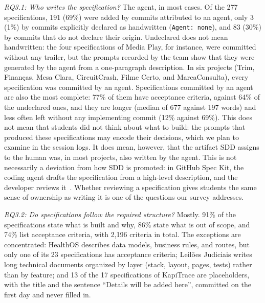 \documentclass[conference]{IEEEtran}
\begin{document}
\emph{RQ3.1: Who writes the specification?} The agent, in most cases. Of the 277 specifications, 191 (69\%) were added by commits attributed to an agent, only 3 (1\%) by commits explicitly declared as handwritten (\texttt{Agent: none}), and 83 (30\%) by commits that do not declare their origin. Undeclared does not mean handwritten: the four specifications of Media Play, for instance, were committed without any trailer, but the prompts recorded by the team show that they were generated by the agent from a one-paragraph description. In six projects (Trim, Finanças, Mesa Clara, CircuitCrash, Filme Certo, and MarcaConsulta), every specification was committed by an agent. Specifications committed by an agent are also the most complete: 77\% of them have acceptance criteria, against 64\% of the undeclared ones, and they are longer (median of 677 against 197 words) and less often left without any implementing commit (12\% against 69\%). This does not mean that students did not think about what to build: the prompts that produced these specifications may encode their decisions, which we plan to examine in the session logs. It does mean, however, that the artifact SDD assigns to the human was, in most projects, also written by the agent. This is not necessarily a deviation from how SDD is promoted: in GitHub Spec Kit, the coding agent drafts the specification from a high-level description, and the developer reviews it~\cite{delimarsky2025speckit}. Whether reviewing a specification gives students the same sense of ownership as writing it is one of the questions our survey addresses.

\emph{RQ3.2: Do specifications follow the required structure?} Mostly. 91\% of the specifications state what is built and why, 86\% state what is out of scope, and 74\% list acceptance criteria, with 2,196 criteria in total. The exceptions are concentrated: HealthOS describes data models, business rules, and routes, but only one of its 23 specifications has acceptance criteria; Leilões Judiciais writes long technical documents organized by layer (stack, layout, pages, tests) rather than by feature; and 13 of the 17 specifications of KapiTrace are placeholders, with the title and the sentence ``Details will be added here'', committed on the first day and never filled in.
\end{document}
